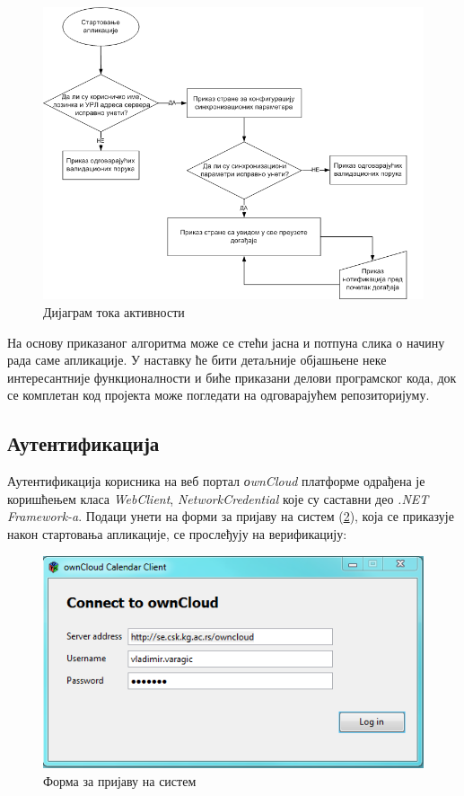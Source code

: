 \begin{figure}[H]
	\centering
	\includegraphics[scale=0.5]{slike/tok_aktivnosti.png}
	\caption{Дијаграм тока активности}
	\label{fig:application_alogorithm}
\end{figure}

На основу приказаног алгоритма  може се стећи јасна и потпуна слика о начину рада саме апликације. У наставку ће бити детаљније објашњене неке интересантније функционалности и биће приказани делови програмског кода, док се комплетан код пројекта може погледати на одговарајућем репозиторијуму\cite{svn_repo}.

\subsection{Аутентификација}

Аутентификација корисника на веб портал \textit{оwnCloud} платформе одрађена је коришћењем класа \textit{WebClient}, \textit{NetworkCredential} које су саставни део \textit{.NET Framework-a}.  Подаци унети на форми за пријаву на систем (\ref{fig:login_form}), која се приказује након стартовања апликације, се прослеђују на верификацију:

\begin{figure}[H]
	\centering
	\includegraphics[scale=0.5]{slike/logInForm.png}
	\caption{Форма за пријаву на систем}
	\label{fig:login_form}
\end{figure}

